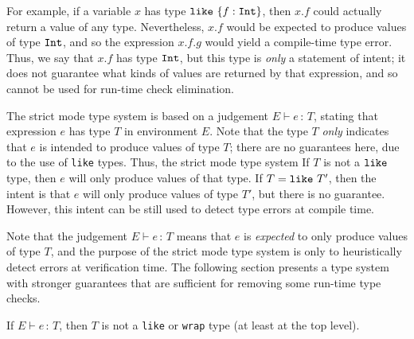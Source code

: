 \documentclass{article}
\newcommand{\judge}[2]{\ensuremath{\Gamma\vdash{#1}:{#2}}}
\newcommand{\Int}{\t{Int}}
\renewcommand{\t}[1]{{\tt #1}}
\renewcommand{\judge}[3]{#1\vdash #2\,:\,#3}
\newcommand{\objty}[1]{\{#1\}}
\newcommand{\objget}[2]{#1.#2}
\newcommand{\likety}[1]{\t{like}~#1}
\begin{document}
For example, if a variable $x$ has type $\likety{\objty{f:\Int}}$,
then $\objget x f$  could actually return a value of any type.  
Nevertheless, 
$\objget x f$
would be expected to produce values of type $\Int$, and so 
the expression
$\objget{\objget x f} g$ would yield a compile-time type error.
Thus, we say that $\objget x f$ has type $\Int$, but this type is \emph{only} a statement of intent;
it does not guarantee what kinds of values are returned by that expression,
and so cannot be used for run-time check elimination.



The strict mode type system is based on a judgement $\judge{E}{e}{T}$,
stating that expression $e$ has type $T$ in environment $E$.
Note that the type $T$ \emph{only} indicates that $e$ is intended to produce values of type $T$; there are no guarantees here, due to the use of \t{like} types. Thus, the strict mode type system 
If $T$ is not a $\likety{}$ type, then $e$ will only produce values of that type.
If $T=\likety{T'}$, then the intent is that $e$ will only produce values of type $T'$,
but there is no guarantee. However, this intent can be still used to detect type errors at compile time.

Note that the judgement $\judge{E}{e}{T}$ means that $e$ is \emph{expected} to only produce values of type $T$,
and the purpose of the strict mode type system is only to heuristically detect errors at verification time.
The following section presents a type system with stronger guarantees that are sufficient for removing some run-time type checks.

If $\judge{E}{e}{T}$, then $T$ is not a \t{like} or \t{wrap} type (at least at the top level).
\end{document}
